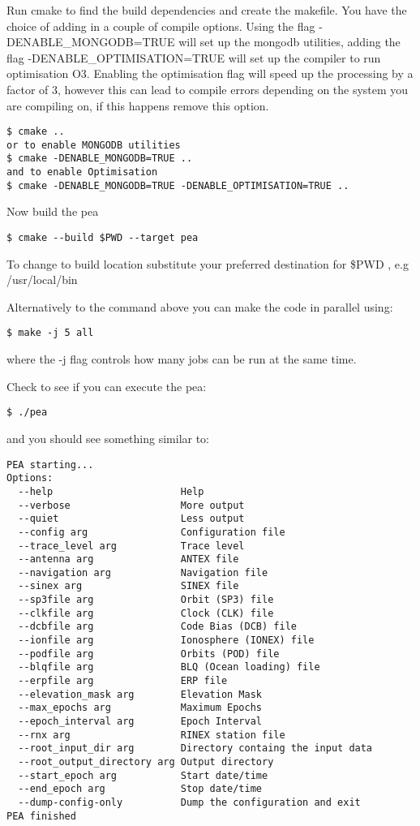 Run cmake to find the build dependencies and create the makefile. You have the choice of adding in a couple of compile options. 
Using the flag -DENABLE\_MONGODB=TRUE will set up the mongodb utilities, adding the flag -DENABLE\_OPTIMISATION=TRUE will set up the compiler to run optimisation O3. 
Enabling the optimisation flag will speed up the processing by a factor of 3, however this can lead to compile errors depending on the system you are compiling on, if this happens remove this option.

\begin{verbatim}
$ cmake ..
or to enable MONGODB utilities
$ cmake -DENABLE_MONGODB=TRUE ..
and to enable Optimisation
$ cmake -DENABLE_MONGODB=TRUE -DENABLE_OPTIMISATION=TRUE ..
\end{verbatim} 
Now build the pea

\begin{verbatim}
$ cmake --build $PWD --target pea
\end{verbatim}

To change to build location substitute your preferred destination for \$PWD , e.g /usr/local/bin

Alternatively to the command above you can make the code in parallel using:
\begin{verbatim}
$ make -j 5 all
\end{verbatim}

where the -j flag controls how many jobs can be run at the same time.

Check to see if you can execute the pea:
\begin{verbatim}
$ ./pea    
\end{verbatim}

and you should see something similar to:
\begin{verbatim}
PEA starting...
Options:
  --help                      Help
  --verbose                   More output
  --quiet                     Less output
  --config arg                Configuration file
  --trace_level arg           Trace level
  --antenna arg               ANTEX file
  --navigation arg            Navigation file
  --sinex arg                 SINEX file
  --sp3file arg               Orbit (SP3) file
  --clkfile arg               Clock (CLK) file
  --dcbfile arg               Code Bias (DCB) file
  --ionfile arg               Ionosphere (IONEX) file
  --podfile arg               Orbits (POD) file
  --blqfile arg               BLQ (Ocean loading) file
  --erpfile arg               ERP file
  --elevation_mask arg        Elevation Mask
  --max_epochs arg            Maximum Epochs
  --epoch_interval arg        Epoch Interval
  --rnx arg                   RINEX station file
  --root_input_dir arg        Directory containg the input data
  --root_output_directory arg Output directory
  --start_epoch arg           Start date/time
  --end_epoch arg             Stop date/time
  --dump-config-only          Dump the configuration and exit
PEA finished
\end{verbatim}

